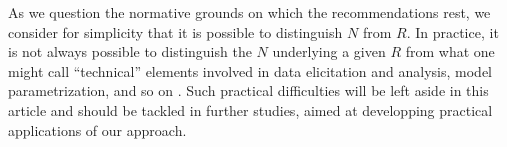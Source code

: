 \documentclass[preprint, french, english, 11pt, authoryear]{elsarticle}%
\newcommand{\commentYM}[1]{\textcolor{green}{YM: #1}}
\newcommand{\commentOC}[1]{\textcolor{red}{OC: #1}}
\begin{document}
As we question the normative grounds on which the recommendations rest, we consider for simplicity that it is possible to distinguish $N$ from $R$. In practice, it is not always possible to distinguish the $N$ underlying a given $R$ from what one might call ``technical'' elements involved in data elicitation and analysis, model parametrization, and so on \citep{baujard_value_2013}. 
Such practical difficulties will be left aside in this article and should be tackled in further studies, aimed at developping practical applications of our approach.



\end{document}
